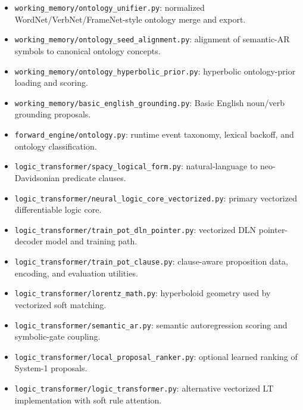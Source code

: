 \documentclass[14pt]{article}
\begin{document}
\begin{description}[style=nextline,leftmargin=1.5em]
  \item[Ontology and semantic grounding.]
    \begin{itemize}[leftmargin=1.5em]
      \item \texttt{working\_memory/ontology\_unifier.py}: normalized
            WordNet/VerbNet/FrameNet-style ontology merge and export.
      \item \texttt{working\_memory/ontology\_seed\_alignment.py}: alignment of
            semantic-AR symbols to canonical ontology concepts.
      \item \texttt{working\_memory/ontology\_hyperbolic\_prior.py}: hyperbolic
            ontology-prior loading and scoring.
      \item \texttt{working\_memory/basic\_english\_grounding.py}: Basic English
            noun/verb grounding proposals.
      \item \texttt{forward\_engine/ontology.py}: runtime event taxonomy,
            lexical backoff, and ontology classification.
    \end{itemize}

  \item[System 1: Logic Transformer.]
    \begin{itemize}[leftmargin=1.5em]
      \item \texttt{logic\_transformer/spacy\_logical\_form.py}: natural-language
            to neo-Davidsonian predicate clauses.
      \item \texttt{logic\_transformer/neural\_logic\_core\_vectorized.py}: primary
            vectorized differentiable logic core.
      \item \texttt{logic\_transformer/train\_pot\_dln\_pointer.py}: vectorized
            DLN pointer-decoder model and training path.
      \item \texttt{logic\_transformer/train\_pot\_clause.py}: clause-aware
            proposition data, encoding, and evaluation utilities.
      \item \texttt{logic\_transformer/lorentz\_math.py}: hyperboloid geometry
            used by vectorized soft matching.
      \item \texttt{logic\_transformer/semantic\_ar.py}: semantic
            autoregression scoring and symbolic-gate coupling.
      \item \texttt{logic\_transformer/local\_proposal\_ranker.py}: optional
            learned ranking of System-1 proposals.
      \item \texttt{logic\_transformer/logic\_transformer.py}: alternative
            vectorized LT implementation with soft rule attention.
    \end{itemize}


\end{description}
\end{document}
